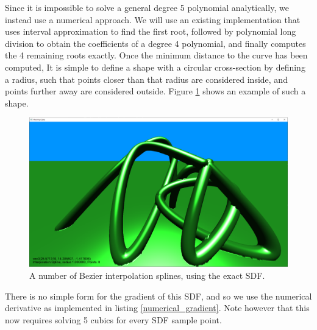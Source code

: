 \documentclass[11pt]{article}
\begin{document}
Since it is impossible to solve a general degree 5 polynomial analytically, we instead use a numerical approach. We will use an existing implementation\cite{kraus_2021} that uses interval approximation to find the first root, followed by polynomial long division to obtain the coefficients of a degree 4 polynomial, and finally computes the 4 remaining roots exactly. Once the minimum distance to the curve has been computed, It is simple to define a shape with a circular cross-section by defining a radius, such that points closer than that radius are considered inside, and points further away are considered outside. Figure \ref{fig:exact_bezier} shows an example of such a shape.
\begin{figure}[H]
  \includegraphics[width=\textwidth]{exact_bezier}
  \caption{A number of Bezier interpolation splines, using the exact SDF.}
  \label{fig:exact_bezier}
\end{figure}

There is no simple form for the gradient of this SDF, and so we use the numerical derivative as implemented in listing \ref{numerical_gradient}. Note however that this now requires solving 5 cubics for every SDF sample point.
\end{document}
